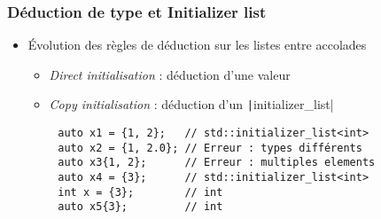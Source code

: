\documentclass[C++.tex]{subfiles}
\begin{document}
\begin{frame}[fragile]
	\frametitle{Déduction de type et Initializer list}
	\begin{itemize}
		\item Évolution des règles de déduction sur les listes entre accolades
		\begin{itemize}
			\item \textit{Direct initialisation} : déduction d'une valeur


			\item \textit{Copy initialisation} : déduction d'un \texttt|initializer_list|

		\end{itemize}
	\end{itemize}

	\begin{verbatim}
		auto x1 = {1, 2};   // std::initializer_list<int>
		auto x2 = {1, 2.0}; // Erreur : types différents
		auto x3{1, 2};      // Erreur : multiples elements
		auto x4 = {3};      // std::initializer_list<int>
		int x = {3};        // int
		auto x5{3};         // int
	\end{verbatim}


\end{frame}
\end{document}
